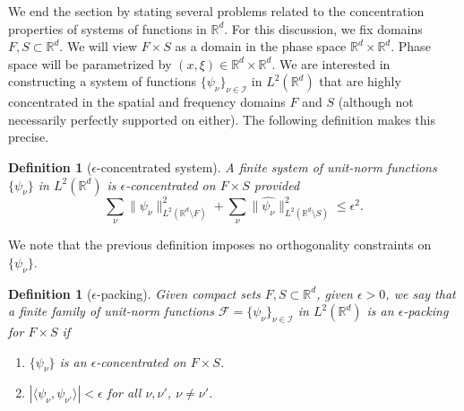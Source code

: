 \documentclass[conference]{IEEEtran}
\def\R{\mathbb{R}}
\newtheorem{definition}[theorem]{Definition}
\numberwithin{equation}{section}
\newcommand{\cI}{\mathcal I}
\def\R{\mathbb{R}}
\begin{document}




We end the section by stating several problems related to the concentration properties of systems of functions in $\R^d$. For this discussion, we fix domains $F, S \subset \R^d$. We will view $F \times S$ as a domain in the phase space $\R^d \times \R^d$. Phase space will be parametrized by $(x,\xi) \in \R^d \times \R^d$. 
We are interested in constructing a system of functions \( \{\psi_\nu\}_{\nu \in \cI} \) in \( L^2(\mathbb{R}^d) \) that are highly concentrated in the spatial and frequency domains \( F \) and \( S \) (although not necessarily perfectly supported on either). The following definition makes this precise.
 

\begin{definition}[$\epsilon$-concentrated system]
A finite 
 system of unit-norm functions $\{\psi_\nu\}$ in $L^2(\R^d)$ is $\epsilon$-concentrated on $F \times S$ provided
\[
\sum_\nu \| \psi_\nu \|_{L^2(\R^d \setminus F)}^2 + \sum_\nu \| \widehat{\psi_\nu}\|_{L^2(\R^d\setminus S)}^2 \leq \epsilon^2.
\]
\end{definition}


We note that the previous definition imposes no orthogonality constraints on \(\{\psi_\nu\}\).


\begin{definition}[$\epsilon$-packing]
Given compact sets $F,S \subset \R^d$, given $\epsilon > 0$, we say that  a finite family of unit-norm functions $\mathcal{F} = \{\psi_\nu\}_{\nu\in \cI}$ in $L^2(\R^d)$ is  an $\epsilon$-packing for $F \times S$ if
\begin{enumerate}
    \item $\{\psi_\nu\}$ is an  $\epsilon$-concentrated on $F \times S$. 
    \item $|\langle \psi_\nu, \psi_{\nu'} \rangle | < \epsilon$ for all $\nu,\nu'$, $\nu\neq \nu'$.
\end{enumerate}
\end{definition}
\end{document}
